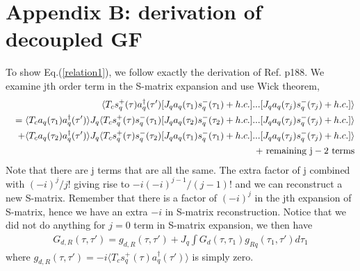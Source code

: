 \documentclass[aps,prb,superscriptaddress]{revtex4-2}
\begin{document}
\section*{Appendix B: derivation of decoupled GF}
To show Eq.(\ref{relation1}), we follow exactly the derivation of Ref. p188. We examine jth order term in the S-matrix expansion and use Wick theorem,
\begin{eqnarray}
&& \langle T_c s^+_q(\tau) a^\dagger_q(\tau') [J_q a_{q}(\tau_1) s^-_q(\tau_1) +h.c.] ...
[J_q a_{q}(\tau_j) s^-_q(\tau_j) +h.c.]\rangle \nonumber \\
&& =\langle T_c a_q(\tau_1) a^\dagger_q(\tau')\rangle J_q \langle T_c s^+_q(\tau)s^-_q(\tau_1) [J_q a_{q}(\tau_2) s^-_q(\tau_2)+h.c. ] ...
[J_q a_{q}(\tau_j) s^-_q(\tau_j) +h.c.]\rangle \nonumber \\
&&+\langle T_c a_q(\tau_2) a^\dagger_q(\tau')\rangle J_q \langle T_c s^+_q(\tau)s^-_q(\tau_2) [J_q a_{q}(\tau_1) s^-_q(\tau_1)+h.c. ] ...
[J_q a_{q}(\tau_j) s^-_q(\tau_j) +h.c.]\rangle \nonumber \\
&& + ~ {\rm remaining ~ j-2 ~ terms}
\end{eqnarray}
Note that there are j terms that are all the same. The extra factor of j combined with $(-i)^j/j!$ giving rise to $-i (-i)^{j-1}/(j-1)!$ and we can reconstruct a new S-matrix. Remember that there is a factor of $(-i)^j$ in the jth expansion of S-matrix, hence we have an extra $-i$ in S-matrix reconstruction. Notice that we did not do anything for $j=0$ term in S-matrix expansion, we then have
\begin{gather}
G_{d,R}(\tau,\tau') = g_{d,R}(\tau,\tau') + J_q \int G_d(\tau,\tau_1) g_{Rq}(\tau_1,\tau')  d\tau_1
\end{gather}
where $g_{d,R}(\tau,\tau')=-i\langle T_c s^+_q(\tau) a^\dagger_q(\tau')\rangle$ is simply zero.
\end{document}
